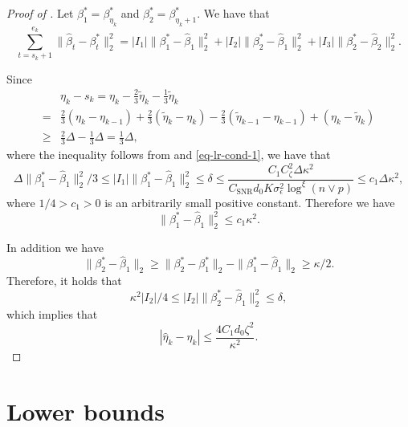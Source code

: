 \documentclass[twoside]{article}
\begin{document}
\begin{proof}[Proof of ]
\vskip 3mm

  Let $\beta^*_1 = \beta^*_{\eta_k}$ and $\beta^*_2 = \beta^*_{\eta_k + 1}$.  We have that
	\[
		\sum_{t = s_k + 1}^{e_k}\|\widehat{\beta}_t - \beta^*_t\|_2^2 = |I_1| \|\beta^*_1 - \widehat{\beta}_1\|_2^2 + |I_2| \|\beta^*_2 - \widehat{\beta}_1\|_2^2 + |I_3| \|\beta^*_2 - \widehat{\beta}_2\|_2^2.
	\]
	
Since
	\begin{align*}
		& \eta_k - s_k = \eta_k - \frac{2}{3}\widetilde{\eta}_k - \frac{1}{3}\widetilde{\eta}_k \\
		= & \frac{2}{3}(\eta_k - \eta_{k-1}) + \frac{2}{3}(\widetilde{\eta}_k - \eta_k) -  \frac{2}{3}(\widetilde{\eta}_{k-1} - \eta_{k-1}) + (\eta_k - \widetilde{\eta}_k) \\
		\geq & \frac{2}{3}\Delta - \frac{1}{3}\Delta = \frac{1}{3}\Delta,
	\end{align*}	
	where the inequality follows from  and \eqref{eq-lr-cond-1}, we have that
	\[
		\Delta\|\beta^*_1 - \widehat{\beta}_1\|_2^2/3 \leq |I_1| \|\beta^*_1 - \widehat{\beta}_1\|_2^2 \leq \delta \leq \frac{C_1 C_{\zeta}^2\Delta \kappa^2} {C_{\mathrm{SNR}}d_0 K \sigma^2_{\epsilon} \log^{\xi}(n \vee p) } \leq c_1 \Delta \kappa^2,
	\]
	where $1/4 > c_1 > 0$ is an arbitrarily small positive constant.  Therefore we have
	\[
		\|\beta^*_1 - \widehat{\beta}_1\|_2^2 \leq c_1 \kappa^2.
	\]
	
In addition we have
	\[
		\|\beta^*_2 - \widehat{\beta}_1\|_2 \geq \|\beta^*_2 - \beta^*_1\|_2 - \|\beta^*_1 - \widehat{\beta}_1\|_2 \geq \kappa/2.
	\]	
	Therefore, it holds that 	
	\[
		\kappa^2 |I_2|/4 \leq |I_2| \|\beta^*_2 - \widehat{\beta}_1\|_2^2 \leq \delta,
	\]
	which implies that 
	\[
		|\widehat{\eta}_k - \eta_k| \leq \frac{4C_1d_0 \zeta^2}{\kappa^2}.
	\]
\end{proof}


\section{Lower bounds}
\end{document}
